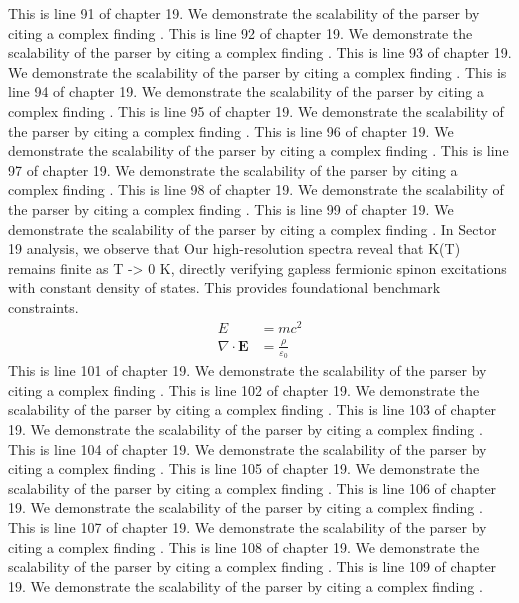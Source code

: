 This is line 91 of chapter 19. We demonstrate the scalability of the parser by citing a complex finding \cite{ref19_91}.
This is line 92 of chapter 19. We demonstrate the scalability of the parser by citing a complex finding \cite{ref19_92}.
This is line 93 of chapter 19. We demonstrate the scalability of the parser by citing a complex finding \cite{ref19_93}.
This is line 94 of chapter 19. We demonstrate the scalability of the parser by citing a complex finding \cite{ref19_94}.
This is line 95 of chapter 19. We demonstrate the scalability of the parser by citing a complex finding \cite{ref19_95}.
This is line 96 of chapter 19. We demonstrate the scalability of the parser by citing a complex finding \cite{ref19_96}.
This is line 97 of chapter 19. We demonstrate the scalability of the parser by citing a complex finding \cite{ref19_97}.
This is line 98 of chapter 19. We demonstrate the scalability of the parser by citing a complex finding \cite{ref19_98}.
This is line 99 of chapter 19. We demonstrate the scalability of the parser by citing a complex finding \cite{ref19_99}.
In Sector 19 analysis, we observe that Our high-resolution spectra reveal that K(T) remains finite as T -> 0 K, directly verifying gapless fermionic spinon excitations with constant density of states. This provides foundational benchmark constraints.
\begin{align*}
  E &= mc^2 \\
  \nabla \cdot \mathbf{E} &= \frac{\rho}{\varepsilon_0}
\end{align*}
This is line 101 of chapter 19. We demonstrate the scalability of the parser by citing a complex finding \cite{ref19_101}.
This is line 102 of chapter 19. We demonstrate the scalability of the parser by citing a complex finding \cite{ref19_102}.
This is line 103 of chapter 19. We demonstrate the scalability of the parser by citing a complex finding \cite{ref19_103}.
This is line 104 of chapter 19. We demonstrate the scalability of the parser by citing a complex finding \cite{ref19_104}.
This is line 105 of chapter 19. We demonstrate the scalability of the parser by citing a complex finding \cite{ref19_105}.
This is line 106 of chapter 19. We demonstrate the scalability of the parser by citing a complex finding \cite{ref19_106}.
This is line 107 of chapter 19. We demonstrate the scalability of the parser by citing a complex finding \cite{ref19_107}.
This is line 108 of chapter 19. We demonstrate the scalability of the parser by citing a complex finding \cite{ref19_108}.
This is line 109 of chapter 19. We demonstrate the scalability of the parser by citing a complex finding \cite{ref19_109}.

